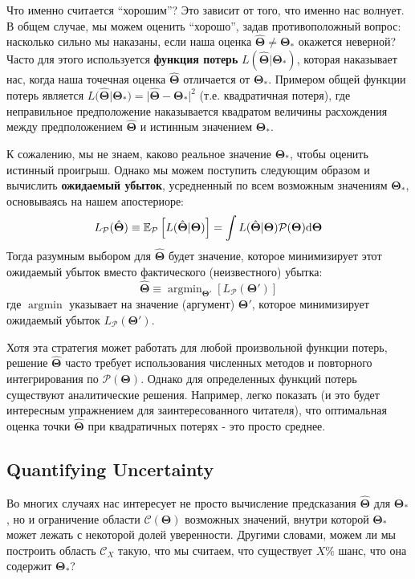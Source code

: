 \documentclass[12pt, titlepage]{article}
\DeclareMathOperator*{\argmin}{argmin}
\newcommand{\deriv}{\ensuremath{{\rm d}}}  %
\newcommand{\meanwrt}[2]{\ensuremath{\mathbb{E}_{{#2}}\left[{#1}\right]}}
\newcommand{\params}{\ensuremath{\boldsymbol\Theta}}
\newcommand{\posterior}{\ensuremath{\mathcal{P}}}
\newcommand{\credible}{\ensuremath{\mathcal{C}}}
\begin{document}
Что именно считается ``хорошим''? Это зависит от того, что именно нас волнует. В общем случае, мы можем оценить ``хорошо'', задав противоположный вопрос: насколько сильно мы наказаны, если наша оценка $\hat{\params} \neq \params_*$ окажется неверной? Часто для этого используется \textbf{функция потерь} $L(\hat{\params}|\params_*)$, которая наказывает нас, когда наша точечная оценка $\hat{\params}$ отличается от $\params_*$. Примером общей функции потерь является $L(\hat{\params}|\params_*) = |\hat{\params} - \params_*|^2$ (т.е. квадратичная потеря), где неправильное предположение наказывается квадратом величины расхождения между предположением $\hat{\params}$ и истинным значением $\params_*$.

К сожалению, мы не знаем, каково реальное значение $\params_*$, чтобы оценить истинный проигрыш. Однако мы можем поступить следующим образом и вычислить \textbf{ожидаемый убыток}, усредненный по всем возможным значениям $\params_*$, основываясь на нашем апостериоре:
\begin{equation}
    L_\posterior(\hat{\params})
    \equiv \meanwrt{L(\hat{\params}|\params)}{\posterior}
    = \int L(\hat{\params}|\params) \posterior(\params) \deriv \params
\end{equation}
Тогда разумным выбором для $\hat{\params}$ будет значение, которое минимизирует этот ожидаемый убыток вместо фактического (неизвестного) убытка:
\begin{equation}
    \hat{\params} 
    \equiv \argmin_{\params'} \left[L_\posterior(\params')\right]
\end{equation}
где $\argmin$ указывает на значение (аргумент) $\params'$, которое минимизирует ожидаемый убыток $L_\posterior(\params')$.

Хотя эта стратегия может работать для любой произвольной функции потерь, решение $\hat{\params}$ часто требует использования численных методов и повторного интегрирования по $\posterior(\params)$. Однако для определенных функций потерь существуют аналитические решения. Например, легко показать (и это будет интересным упражнением для заинтересованного читателя), что оптимальная оценка точки $\hat{\params}$ при квадратичных потерях - это просто среднее.

\subsection{Quantifying Uncertainty} \label{subsec: guess}

Во многих случаях нас интересует не просто вычисление предсказания $\hat{\params}$ для $\params_*$, но и ограничение области $\credible(\params)$ возможных значений, внутри которой $\params_*$ может лежать с некоторой долей уверенности. Другими словами, можем ли мы построить область $\credible_X$ такую, что мы считаем, что существует $X\%$ шанс, что она содержит $\params_*$?
\end{document}
